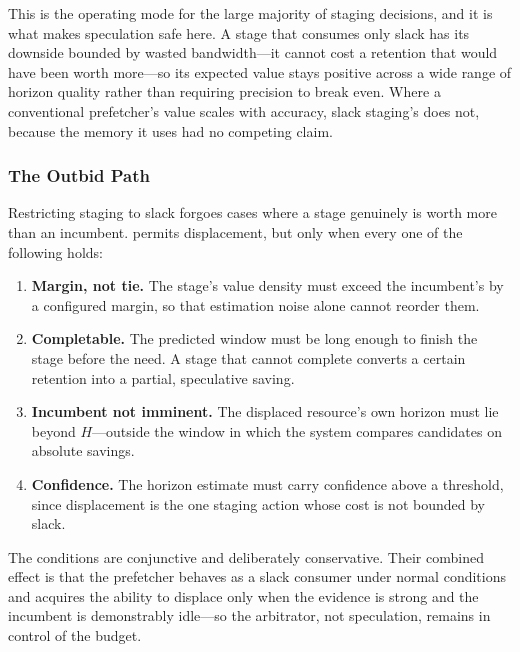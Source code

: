This is the operating mode for the large majority of staging decisions, and it
is what makes speculation safe here. A stage that consumes only slack has its
downside bounded by wasted bandwidth---it cannot cost a retention that would
have been worth more---so its expected value stays positive across a wide
range of horizon quality rather than requiring precision to break even. Where
a conventional prefetcher's value scales with accuracy, slack staging's does
not, because the memory it uses had no competing claim.

\subsubsection{The Outbid Path}

Restricting staging to slack forgoes cases where a stage genuinely is worth
more than an incumbent. \sysname permits displacement, but only when every one
of the following holds:

\begin{enumerate}\itemsep2pt
\item \textbf{Margin, not tie.} The stage's value density must exceed the
      incumbent's by a configured margin, so that estimation noise alone
      cannot reorder them.
\item \textbf{Completable.} The predicted window must be long enough to finish
      the stage before the need. A stage that cannot complete converts a
      certain retention into a partial, speculative saving.
\item \textbf{Incumbent not imminent.} The displaced resource's own horizon
      must lie beyond $H$---outside the window in which the system compares
      candidates on absolute savings.
\item \textbf{Confidence.} The horizon estimate must carry confidence above a
      threshold, since displacement is the one staging action whose cost is
      not bounded by slack.
\end{enumerate}

The conditions are conjunctive and deliberately conservative. Their combined
effect is that the prefetcher behaves as a slack consumer under normal
conditions and acquires the ability to displace only when the evidence is
strong and the incumbent is demonstrably idle---so the arbitrator, not
speculation, remains in control of the budget.
